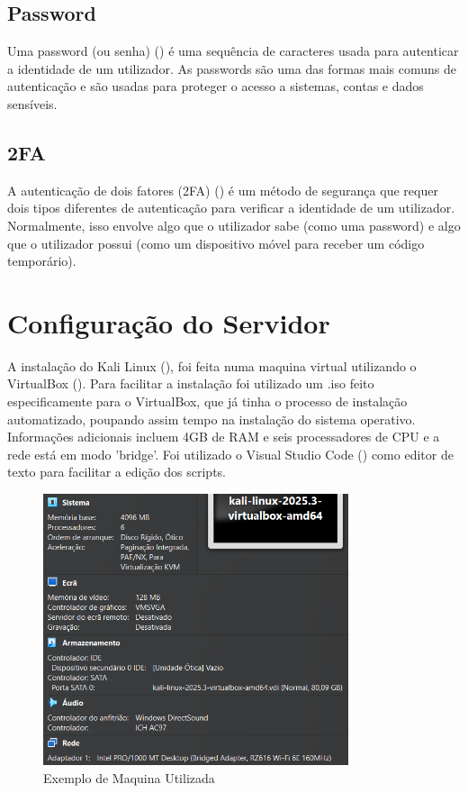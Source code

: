 \documentclass[a4paper]{article}
\begin{document}
\subsection{Password}
Uma password (ou senha) (\cite{password}) é uma sequência de caracteres usada para autenticar a identidade de um utilizador.
As passwords são uma das formas mais comuns de autenticação e são usadas para proteger o acesso a sistemas, contas e dados sensíveis.

\subsection{2FA}
A autenticação de dois fatores (2FA) (\cite{2fa}) é um método de segurança que requer dois tipos diferentes de autenticação para verificar
a identidade de um utilizador. Normalmente, isso envolve algo que o utilizador sabe (como uma password) e algo que o
utilizador possui (como um dispositivo móvel para receber um código temporário).

\newpage
\section{Configuração do Servidor}\label{obj}
A instalação do Kali Linux (\cite{kali}), foi feita numa maquina virtual utilizando o VirtualBox (\cite{virtualbox}).
Para facilitar a instalação foi utilizado um .iso feito especificamente para o VirtualBox, que já tinha o processo de instalação
automatizado, poupando assim tempo na instalação do sistema operativo.\\

Informações adicionais incluem 4GB de RAM e seis processadores de CPU e a rede está em modo 'bridge'.
Foi utilizado o Visual Studio Code (\cite{vscode}) como editor de texto para facilitar a edição dos scripts.\\

\begin{figure}[h!]
	\centering
	\includegraphics[width=0.8\textwidth]{Recursos/Server.png}
	\caption{Exemplo de Maquina Utilizada}
	\label{fig:nfswarning}
\end{figure}
\end{document}
